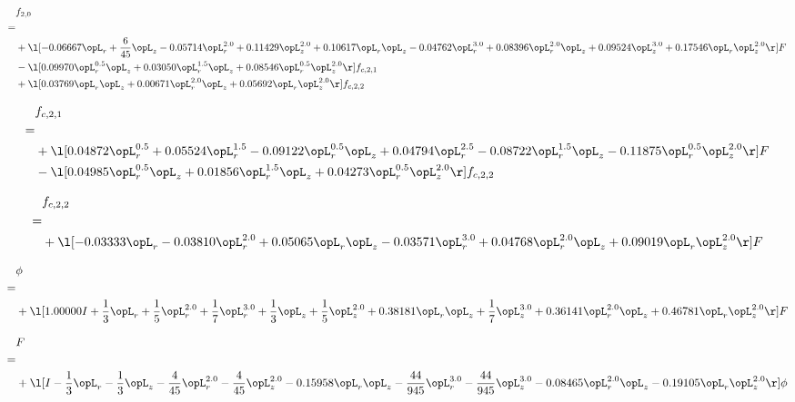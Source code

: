 \begin{alignat}{2} 
\label{eq:f_20_2} 
& f_{2,0} \nonumber \\ 
 = \\ 
& + \l[  -0.06667 \opL_r + \frac{6}{45} \opL_z   -0.05714 \opL_r^{2.0} +  0.11429 \opL_z^{2.0} +  0.10617 \opL_r \opL_z   -0.04762 \opL_r^{3.0} +  0.08396 \opL_r^{2.0} \opL_z +  0.09524 \opL_z^{3.0} +  0.17546 \opL_r \opL_z^{2.0}  \r] F \nonumber \\ 
& - \l[  0.09970 \opL_r^{0.5} \opL_z +  0.03050 \opL_r^{1.5} \opL_z +  0.08546 \opL_r^{0.5} \opL_z^{2.0}  \r] f_{c,2,1} \nonumber \\ 
& + \l[  0.03769 \opL_r \opL_z +  0.00671 \opL_r^{2.0} \opL_z +  0.05692 \opL_r \opL_z^{2.0}  \r] f_{c,2,2} \nonumber \\ 
\end{alignat} 


\begin{alignat}{2} 
\label{eq:f_21_2} 
& f_{c,2,1} \nonumber \\ 
 = \\ 
& + \l[  0.04872 \opL_r^{0.5} +  0.05524 \opL_r^{1.5}   -0.09122 \opL_r^{0.5} \opL_z +  0.04794 \opL_r^{2.5}   -0.08722 \opL_r^{1.5} \opL_z   -0.11875 \opL_r^{0.5} \opL_z^{2.0}  \r] F \nonumber \\ 
& - \l[  0.04985 \opL_r^{0.5} \opL_z +  0.01856 \opL_r^{1.5} \opL_z +  0.04273 \opL_r^{0.5} \opL_z^{2.0}  \r] f_{c,2,2} \nonumber \\ 
\end{alignat} 


\begin{alignat}{2} 
\label{eq:f_22_2} 
& f_{c,2,2} \nonumber \\ 
 = \\ 
& + \l[  -0.03333 \opL_r   -0.03810 \opL_r^{2.0} +  0.05065 \opL_r \opL_z   -0.03571 \opL_r^{3.0} +  0.04768 \opL_r^{2.0} \opL_z +  0.09019 \opL_r \opL_z^{2.0}  \r] F \nonumber \\ 
\end{alignat} 


\begin{alignat}{2} 
\label{eq:scalarFlux_1} 
& \phi \nonumber \\ 
 = \\ 
& + \l[  1.00000 I + \frac{1}{3} \opL_r + \frac{1}{5} \opL_r^{2.0} + \frac{1}{7} \opL_r^{3.0} + \frac{1}{3} \opL_z + \frac{1}{5} \opL_z^{2.0} +  0.38181 \opL_r \opL_z + \frac{1}{7} \opL_z^{3.0} +  0.36141 \opL_r^{2.0} \opL_z +  0.46781 \opL_r \opL_z^{2.0}  \r] F \nonumber \\ 
\end{alignat} 


\begin{alignat}{2} 
\label{eq:transport3D_0} 
& F \nonumber \\ 
 = \\ 
& + \l[ I - \frac{1}{3} \opL_r - \frac{1}{3} \opL_z - \frac{4}{45} \opL_r^{2.0} - \frac{4}{45} \opL_z^{2.0}   -0.15958 \opL_r \opL_z - \frac{44}{945} \opL_r^{3.0} - \frac{44}{945} \opL_z^{3.0}   -0.08465 \opL_r^{2.0} \opL_z   -0.19105 \opL_r \opL_z^{2.0}  \r] \phi \nonumber \\ 
\end{alignat} 


